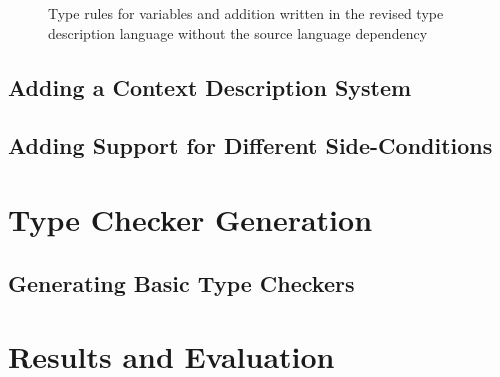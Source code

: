 \documentclass{UoYCSproject}
\begin{document}
\begin{figure}
\lstset{basicstyle=\footnotesize\ttfamily, frame=single,
    language=,}

\caption{Type rules for variables and addition written in the revised type
    description language without the source language dependency}
\label{fig:RevisedTypeLanguage}
\end{figure}


\section{Adding a Context Description System}

\section{Adding Support for Different Side-Conditions}

\chapter{Type Checker Generation}

\section{Generating Basic Type Checkers}

\chapter{Results and Evaluation}

\printbibliography
\end{document}

